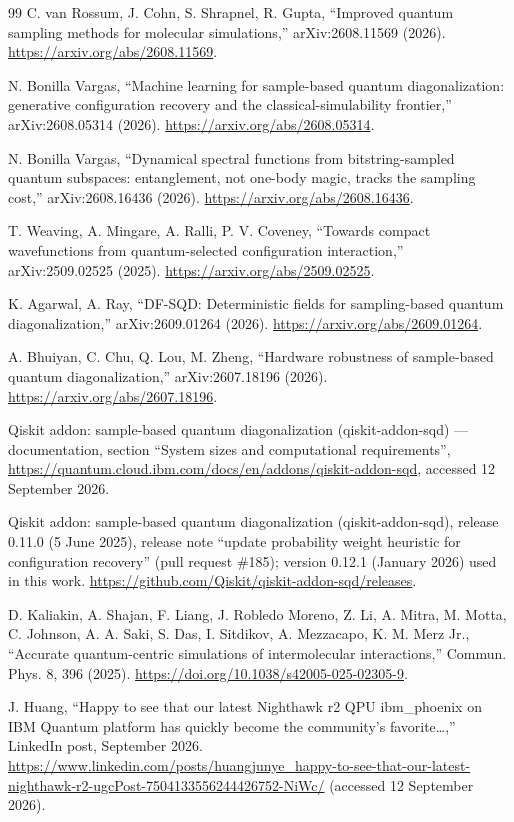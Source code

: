 \documentclass[11pt]{article}
\begin{document}
\begin{thebibliography}{99}
C. van Rossum, J. Cohn, S. Shrapnel, R. Gupta, ``Improved quantum sampling methods for molecular simulations,'' arXiv:2608.11569 (2026). \url{https://arxiv.org/abs/2608.11569}.

N. Bonilla Vargas, ``Machine learning for sample-based quantum diagonalization: generative configuration recovery and the classical-simulability frontier,'' arXiv:2608.05314 (2026). \url{https://arxiv.org/abs/2608.05314}.

N. Bonilla Vargas, ``Dynamical spectral functions from bitstring-sampled quantum subspaces: entanglement, not one-body magic, tracks the sampling cost,'' arXiv:2608.16436 (2026). \url{https://arxiv.org/abs/2608.16436}.

T. Weaving, A. Mingare, A. Ralli, P. V. Coveney, ``Towards compact wavefunctions from quantum-selected configuration interaction,'' arXiv:2509.02525 (2025). \url{https://arxiv.org/abs/2509.02525}.

K. Agarwal, A. Ray, ``DF-SQD: Deterministic fields for sampling-based quantum diagonalization,'' arXiv:2609.01264 (2026). \url{https://arxiv.org/abs/2609.01264}.

A. Bhuiyan, C. Chu, Q. Lou, M. Zheng, ``Hardware robustness of sample-based quantum diagonalization,'' arXiv:2607.18196 (2026). \url{https://arxiv.org/abs/2607.18196}.

Qiskit addon: sample-based quantum diagonalization (qiskit-addon-sqd) --- documentation, section ``System sizes and computational requirements'', \url{https://quantum.cloud.ibm.com/docs/en/addons/qiskit-addon-sqd}, accessed 12 September 2026.

Qiskit addon: sample-based quantum diagonalization (qiskit-addon-sqd), release 0.11.0 (5 June 2025), release note ``update probability weight heuristic for configuration recovery'' (pull request \#185); version 0.12.1 (January 2026) used in this work. \url{https://github.com/Qiskit/qiskit-addon-sqd/releases}.

D. Kaliakin, A. Shajan, F. Liang, J. Robledo Moreno, Z. Li, A. Mitra, M. Motta, C. Johnson, A. A. Saki, S. Das, I. Sitdikov, A. Mezzacapo, K. M. Merz Jr., ``Accurate quantum-centric simulations of intermolecular interactions,'' Commun. Phys. 8, 396 (2025). \url{https://doi.org/10.1038/s42005-025-02305-9}.

J. Huang, ``Happy to see that our latest Nighthawk r2 QPU ibm\_phoenix on IBM Quantum platform has quickly become the community's favorite\ldots{},'' LinkedIn post, September 2026. \url{https://www.linkedin.com/posts/huangjunye_happy-to-see-that-our-latest-nighthawk-r2-ugcPost-7504133556244426752-NiWc/} (accessed 12 September 2026).


\end{thebibliography}
\end{document}
